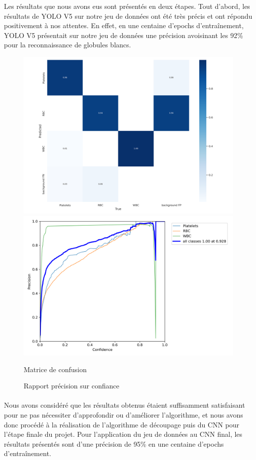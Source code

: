 \label{part3}
Les résultats que nous avons eus sont présentés en deux étapes. Tout d'abord, les résultats de YOLO V5 sur notre jeu de données ont été très précis et ont répondu positivement à nos attentes. En effet, en une centaine d'epochs d'entraînement, YOLO V5 présentait sur notre jeu de données une précision avoisinant les 92\% pour la reconnaissance de globules blancs. 

\begin{figure}[!h]
    \centering
    \includegraphics[scale=0.22]{images/confusion_matrix.png}
    \includegraphics[scale=0.35]{images/precision_confidence.png}
    \caption{Matrice de confusion}
    \caption{Rapport précision sur confiance}
    \label{fig:matrice-precision}
\end{figure}

\paragraph{}
Nous avons considéré que les résultats obtenus étaient suffisamment satisfaisant pour ne pas nécessiter d'approfondir ou d'améliorer l'algorithme, et nous avons donc procédé à la réalisation de l'algorithme de découpage puis du CNN pour l'étape finale du projet.
Pour l'application du jeu de données au CNN final, les résultats présentés sont d'une précision de 95\% en une centaine d'epochs d'entraînement.